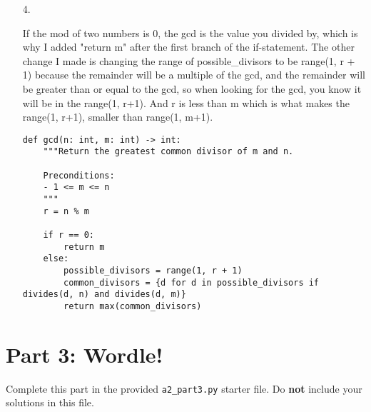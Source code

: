 \documentclass[11pt]{article}
\begin{document}
\begin{enumerate}
\begin{proof}
By Quotient Remainder Theorem: \\
$0 \leq r < |m|$ and $\exists c \in \mathbb{Z}$ such that \\
$n \% m = r \rightarrow mc + r = n$ \\
mc is a multiple of d because $m = bd$, and $c \in \mathbb{Z}$. \\
r is a multiple of d because $r = n \% m$ and $d|n\%m$. \\
$\exists x \in \mathbb{Z}$ such that $mc = dx$ \\
$\exists y \in \mathbb{Z}$ such that $r = dy$ \\
$mc + r = n$ can be rewritten as: \\
$dx + dy = n$ \\
$d(x+y) = n$ \\
This shows that n is a multiple of d. \\
Therefore: $d|n$ \\
I have now proven (1) and (2) which proves that $d|n \iff d|n \% m $. \\
Therefore: $\forall n, m, d \in \mathbb{Z}, d|m \land m \neq 0 \implies (d|n \iff d|n \% m)$.
\end{proof}

\item[4.]

If the mod of two numbers is 0, the gcd is the value you divided by, which is why I added "return m" after the first branch of the if-statement. The other change I made is changing the range of possible\_divisors to be range(1, r + 1) because the remainder will be a multiple of the gcd, and the remainder will be greater than or equal to the gcd, so when looking for the gcd, you know it will be in the range(1, r+1). And r is less than m which is what makes the range(1, r+1), smaller than range(1, m+1).

\begin{verbatim}
def gcd(n: int, m: int) -> int:
    """Return the greatest common divisor of m and n.

    Preconditions:
    - 1 <= m <= n
    """
    r = n % m

    if r == 0:
        return m
    else:
        possible_divisors = range(1, r + 1)
        common_divisors = {d for d in possible_divisors if divides(d, n) and divides(d, m)}
        return max(common_divisors)
\end{verbatim}
\end{enumerate}


\section*{Part 3: Wordle!}

Complete this part in the provided \texttt{a2\_part3.py} starter file.
Do \textbf{not} include your solutions in this file.
\end{document}
